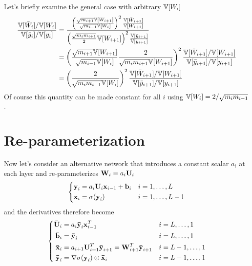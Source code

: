 \section{}

Let's briefly examine the general case with arbitrary $\mathbb{V}[W_{i}]$
\begin{align}
\frac{ \mathbb{V}[\bar{W}_{i}] / \mathbb{V}[W_{i}] }{ \mathbb{V}[\bar{y}_{i}] / \mathbb{V}[y_{i}] }
& = \frac{
  \left(\frac{\sqrt{m_{i+1}} \mathbb{V}[W_{i+1}]}{\sqrt{m_{i - 1}} \mathbb{V}[W_{i}]}\right)^2 \frac{\mathbb{V}[\bar{W}_{i+1}]}{\mathbb{V}[W_{i+1}]} }{
  \left(\frac{\sqrt{m_{i} m_{i+1}}}{2} \mathbb{V}[W_{i+1}]\right)^2 \frac{\mathbb{V}[\bar{y}_{i+1}]}{\mathbb{V}[y_{i+1}]} } \\
& = \left( \frac{\sqrt{m_{i+1}} \mathbb{V}[W_{i+1}]}{\sqrt{m_{i - 1}} \mathbb{V}[W_{i}]}
  \frac{2}{\sqrt{m_{i} m_{i+1}} \mathbb{V}[W_{i+1}]} \right)^2
  \frac{ \mathbb{V}[\bar{W}_{i+1}] / \mathbb{V}[W_{i+1}] }{ \mathbb{V}[\bar{y}_{i+1}] / \mathbb{V}[y_{i+1}] } \\
& = \left( \frac{2}{\sqrt{m_{i} m_{i - 1}} \mathbb{V}[W_{i}]} \right)^2
  \frac{ \mathbb{V}[\bar{W}_{i+1}] / \mathbb{V}[W_{i+1}] }{ \mathbb{V}[\bar{y}_{i+1}] / \mathbb{V}[y_{i+1}] }
\end{align}
Of course this quantity can be made constant for all $i$ using $\mathbb{V}[W_{i}] = 2 / \sqrt{m_{i} m_{i-1}}$.


\section{Re-parameterization}

Now let's consider an alternative network that introduces a constant scalar $a_{i}$ at each layer and re-parameterizes $\boldsymbol{\mathbf{W}}_{i} = a_{i} \boldsymbol{\mathbf{U}}_{i}$
\begin{equation}
\left\{ \begin{aligned}
\boldsymbol{\mathbf{y}}_{i} & = a_{i} \boldsymbol{\mathbf{U}}_{i} \boldsymbol{\mathbf{x}}_{i - 1} + \boldsymbol{\mathbf{b}}_{i} && i = 1, \dots, L\\
\boldsymbol{\mathbf{x}}_{i} & = \sigma(\boldsymbol{\mathbf{y}}_{i}) && i = 1, \dots, L - 1
\end{aligned} \right.
\end{equation}
and the derivatives therefore become
\begin{equation}
\left\{ \begin{aligned}
\boldsymbol{\mathbf{\bar{U}}}_{i} & = a_{i} \boldsymbol{\mathbf{\bar{y}}}_{i} \boldsymbol{\mathbf{x}}_{i - 1}^T && i = L, \dots, 1 \\
\boldsymbol{\mathbf{\bar{b}}}_{i} & = \boldsymbol{\mathbf{\bar{y}}}_{i} && i = L, \dots, 1 \\
\boldsymbol{\mathbf{\bar{x}}}_{i} & = a_{i+1} \boldsymbol{\mathbf{U}}_{i + 1}^T \boldsymbol{\mathbf{\bar{y}}}_{i + 1} = \boldsymbol{\mathbf{W}}_{i + 1}^T \boldsymbol{\mathbf{\bar{y}}}_{i + 1} && i = L - 1, \dots, 1 \\
\boldsymbol{\mathbf{\bar{y}}}_{i} & = \nabla\sigma(\boldsymbol{\mathbf{y}}_{i}) \odot \boldsymbol{\mathbf{\bar{x}}}_{i} && i = L - 1, \dots, 1
\end{aligned} \right.
\end{equation}

